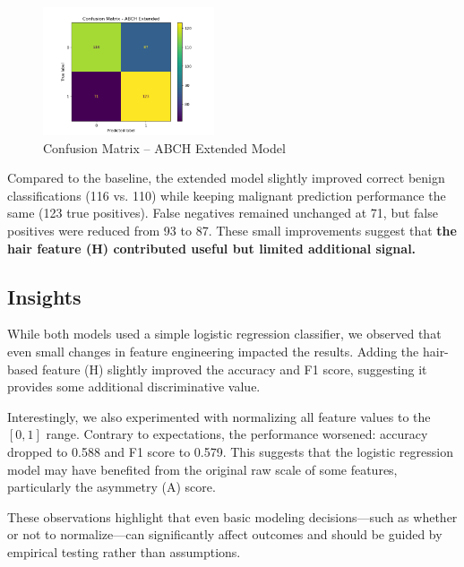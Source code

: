 \documentclass[10pt,twocolumn]{article}
\begin{document}
\begin{figure}[h]
    \centering
    \includegraphics[width=0.45\textwidth]{matrix_extended.png}
    \caption{Confusion Matrix – ABCH Extended Model}
    \label{fig:matrix_extended}
\end{figure}

Compared to the baseline, the extended model slightly improved correct benign classifications (116 vs. 110) while keeping malignant prediction performance the same (123 true positives). False negatives remained unchanged at 71, but false positives were reduced from 93 to 87. These small improvements suggest that \textbf{ the hair feature (H) contributed useful but limited additional signal.}

\subsection{Insights}
While both models used a simple logistic regression classifier, we observed that even small changes in feature engineering impacted the results. Adding the hair-based feature (H) slightly improved the accuracy and F1 score, suggesting it provides some additional discriminative value.

Interestingly, we also experimented with normalizing all feature values to the \([0, 1]\) range. Contrary to expectations, the performance worsened: accuracy dropped to 0.588 and F1 score to 0.579. This suggests that the logistic regression model may have benefited from the original raw scale of some features, particularly the asymmetry (A) score. 

These observations highlight that even basic modeling decisions—such as whether or not to normalize—can significantly affect outcomes and should be guided by empirical testing rather than assumptions.
\end{document}
